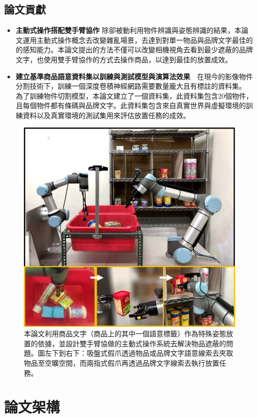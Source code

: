 \subsection{論文貢獻}
\begin{itemize}
\item \textbf{主動式操作搭配雙手臂協作} 除卻被動利用物件辨識與姿態辨識的結果，本論文運用主動式操作概念去改變雜亂場景，去達到對單一物品與品牌文字最佳的的感知能力。本論文提出的方法不僅可以改變相機視角去看到最少遮蔽的品牌文字，也使用雙手臂協作的方式去操作商品，以達到最佳的放置成效。
\item \textbf{建立基準商品語意資料集以訓練與測試模型與演算法效果}　在現今的影像物件分割技術下，訓練一個深度卷積神經網路需要數量龐大且有標註的資料集。
為了訓練物件切割模型，本論文建立了一個資料集，此資料集包含20個物件，且每個物件都有條碼與品牌文字。此資料集包含來自真實世界與虛擬環境的訓練資料以及真實環境的測試集用來評估放置任務的成效。
\end{itemize}

\begin{figure}[ht]
	\centering
	\includegraphics[height=!, width=0.7\linewidth, keepaspectratio=true]
	{./figures/pose-aware-placing-teaser-v3.jpg}
  \caption{本論文利用商品文字（商品上的其中一個語意標籤）作為特殊姿態放置的依據，並設計雙手臂協做的主動式操作系統去解決物品遮蔽的問題。圖左下到右下：吸盤式假爪透過物品或品牌文字語意線索去夾取物品至空曠空間，而兩指式假爪再透過品牌文字線索去執行放置任務。}
  \label{figure:teaser}
\end{figure}

\section{論文架構}
